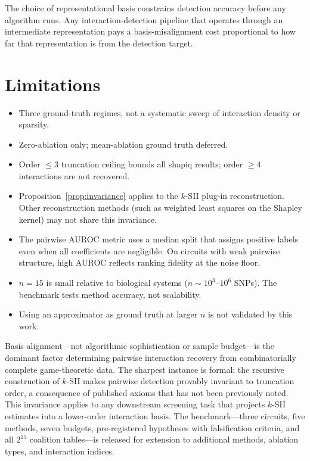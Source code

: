 \documentclass[10pt]{article}
\begin{document}
The choice of representational basis constrains detection accuracy
before any algorithm runs. Any interaction-detection pipeline that
operates through an intermediate representation pays a
basis-misalignment cost proportional to how far that
representation is from the detection target.


\section{Limitations}
\label{sec:limitations}

\begin{itemize}
\item Three ground-truth regimes, not a systematic sweep of
      interaction density or sparsity.
\item Zero-ablation only; mean-ablation ground truth deferred.
\item Order $\leq 3$ truncation ceiling bounds all shapiq results;
      order $\geq 4$ interactions are not recovered.
\item Proposition~\ref{prop:invariance} applies to the $k$-SII
      plug-in reconstruction. Other reconstruction methods (such as
      weighted least squares on the Shapley kernel) may not share
      this invariance.
\item The pairwise AUROC metric uses a median split that assigns
      positive labels even when all coefficients are negligible.
      On circuits with weak pairwise structure, high AUROC reflects
      ranking fidelity at the noise floor.
\item $n = 15$ is small relative to biological systems
      ($n \sim 10^3$--$10^6$ SNPs). The benchmark tests method
      accuracy, not scalability.
\item Using an approximator as ground truth at larger $n$ is not
      validated by this work.
\end{itemize}


Basis alignment---not algorithmic sophistication or sample
budget---is the dominant factor determining pairwise interaction
recovery from combinatorially complete game-theoretic data.
The sharpest instance is formal: the recursive construction of
$k$-SII makes pairwise detection provably invariant to truncation
order, a consequence of published axioms that has not been
previously noted. This invariance applies to any downstream
screening task that projects $k$-SII estimates into a lower-order
interaction basis. The benchmark---three circuits, five methods,
seven budgets, pre-registered hypotheses with falsification
criteria, and all $2^{15}$ coalition tables---is released for
extension to additional methods, ablation types, and interaction
indices.





\end{document}
